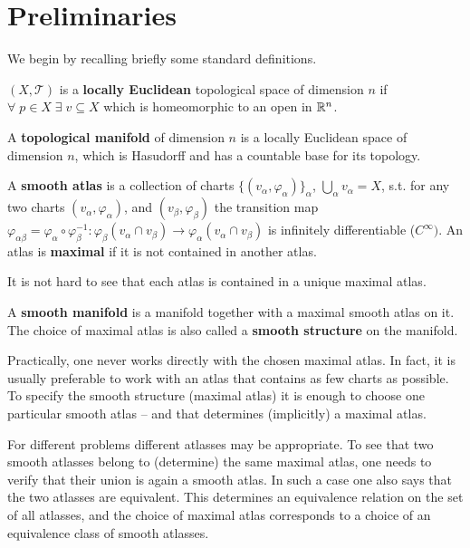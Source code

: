 \documentclass[11pt,a4paper]{report}
\begin{document}
      \section{Preliminaries}
      
	    We begin by recalling briefly some standard definitions.
      
\begin{defn}
     $(X,\mathcal{T})$ is a \textbf{locally Euclidean} topological space of dimension $n$  if $\forall \; p \in X \; \exists \; v \subseteq X$ which is homeomorphic to an open in $\mathbb{R}^n$.
\end{defn}
\begin{defn}
      A \textbf{topological manifold} of dimension $n$ is a locally Euclidean space of dimension $n$, which is Hasudorff and has a countable base for its topology.
\end{defn}
\begin{defn}
      A \textbf{smooth atlas} is a collection of charts $\{ (v_{\alpha}, \varphi_{\alpha}) \}_{\alpha}$, $\bigcup_{\alpha} v_{\alpha} = X$, s.t. 
      for any two charts $(v_{\alpha} , \varphi_{\alpha})$, and $(v_{\beta} , \varphi_{\beta})$
      the transition map 
      $\varphi_{\alpha \beta} = \varphi_{\alpha} \circ \varphi_{\beta}^{-1} : \varphi_{\beta}(v_{\alpha} \cap v_{\beta}) \to \varphi_{\alpha}(v_{\alpha} \cap v_{\beta})$ 
      is infinitely differentiable ($C^{\infty})$. An atlas is \textbf{maximal} if it is not contained in another atlas.
\end{defn}
	 
	 It is not hard to see that each atlas is contained in a unique maximal atlas.

\begin{defn}
  A \textbf{smooth manifold} is a manifold together with a maximal smooth atlas on it. The choice of maximal atlas is also called a \textbf{smooth structure}
  on the manifold.
\end{defn}

     Practically, one never works directly with the chosen maximal atlas. In fact, it is usually preferable to work with an atlas that
     contains as few charts as possible. To specify the smooth structure (maximal atlas) it is enough to choose one particular smooth atlas -- and
     that determines (implicitly) a maximal atlas.
     
     For different problems different atlasses may be appropriate. To see that two smooth atlasses belong to (determine) the same maximal atlas, one needs
     to verify that their union is again a smooth atlas. In such a case one also says that the two atlasses are equivalent.
     This determines an equivalence relation on the set of all atlasses, and the choice of maximal atlas corresponds to a choice of an equivalence
     class of smooth atlasses.
     
\end{document}

